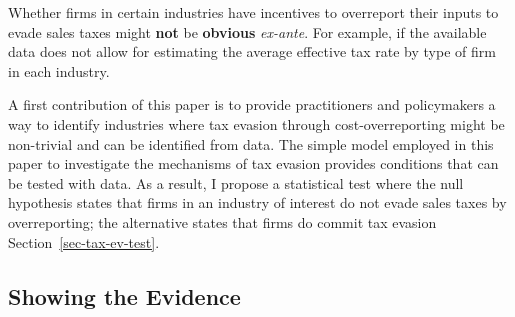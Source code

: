 \documentclass[
  12pt]{article}
\theoremstyle{definition}
\theoremstyle{remark}
\begin{document}
Whether firms in certain industries have incentives to overreport their
inputs to evade sales taxes might \textbf{not} be \textbf{obvious}
\emph{ex-ante}. For example, if the available data does not allow for
estimating the average effective tax rate by type of firm in each
industry.

A first contribution of this paper is to provide practitioners and
policymakers a way to identify industries where tax evasion through
cost-overreporting might be non-trivial and can be identified from data.
The simple model employed in this paper to investigate the mechanisms of
tax evasion provides conditions that can be tested with data. As a
result, I propose a statistical test where the null hypothesis states
that firms in an industry of interest do not evade sales taxes by
overreporting; the alternative states that firms do commit tax evasion
Section~\ref{sec-tax-ev-test}.

\subsection{Showing the Evidence}\label{showing-the-evidence}
\end{document}

